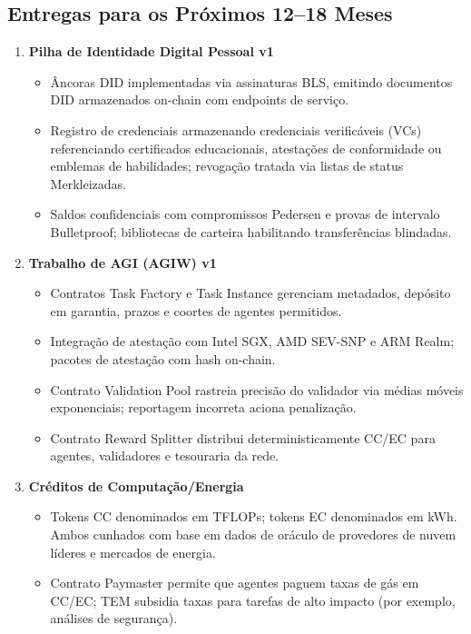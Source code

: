 \documentclass[11pt]{article}
\begin{document}
\subsection{Entregas para os Próximos 12--18 Meses}
\begin{enumerate}[label=\textbf{D\arabic*.}, leftmargin=*]
  \item \textbf{Pilha de Identidade Digital Pessoal v1}
  \begin{itemize}[noitemsep]
    \item Âncoras DID implementadas via assinaturas BLS, emitindo documentos DID armazenados on-chain com endpoints de serviço.
    \item Registro de credenciais armazenando credenciais verificáveis (VCs) referenciando certificados educacionais, atestações de conformidade ou emblemas de habilidades; revogação tratada via listas de status Merkleizadas.
    \item Saldos confidenciais com compromissos Pedersen e provas de intervalo Bulletproof; bibliotecas de carteira habilitando transferências blindadas.
  \end{itemize}
  \item \textbf{Trabalho de AGI (AGIW) v1}
  \begin{itemize}[noitemsep]
    \item Contratos Task Factory e Task Instance gerenciam metadados, depósito em garantia, prazos e coortes de agentes permitidos.
    \item Integração de atestação com Intel SGX, AMD SEV-SNP e ARM Realm; pacotes de atestação com hash on-chain.
    \item Contrato Validation Pool rastreia precisão do validador via médias móveis exponenciais; reportagem incorreta aciona penalização.
    \item Contrato Reward Splitter distribui deterministicamente CC/EC para agentes, validadores e tesouraria da rede.
  \end{itemize}
  \item \textbf{Créditos de Computação/Energia}
  \begin{itemize}[noitemsep]
    \item Tokens CC denominados em TFLOPs; tokens EC denominados em kWh. Ambos cunhados com base em dados de oráculo de provedores de nuvem líderes e mercados de energia.
    \item Contrato Paymaster permite que agentes paguem taxas de gás em CC/EC; TEM subsidia taxas para tarefas de alto impacto (por exemplo, análises de segurança).

\end{itemize}
\end{enumerate}
\end{document}
